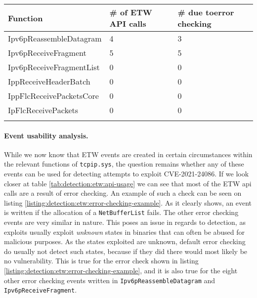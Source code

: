 \documentclass{report}
\begin{document}
{
\begin{tabularx}{\textwidth}{llX}
\textbf{Function}        & \textbf{\# of \gls{ETW} API calls} & \textbf{\# due to\newline error checking} \\ \hline
Ipv6pReassembleDatagram  & 4                            & 3                                 \\
Ipv6pReceiveFragment     & 5                            & 5                                 \\
Ipv6pReceiveFragmentList & 0                            & 0                                 \\
IppReceiveHeaderBatch    & 0                            & 0                                 \\
IppFlcReceivePacketsCore & 0                            & 0                                 \\
IpFlcReceivePackets      & 0                            & 0                                 \\
\caption{\gls{ETW} API calls for functions related to CVE-2021-24086}
\label{tab:detection:etw:api-usage}
\end{tabularx}
}


\paragraph{Event usability analysis.}
While we now know that \gls{ETW} events are created in certain circumstances within the relevant functions of \texttt{tcpip.sys}, the question remains whether any of these events can be used for detecting attempts to exploit CVE-2021-24086. If we look closer at table \ref{tab:detection:etw:api-usage} we can see that most of the \gls{ETW} api calls are a result of error checking. An example of such a check can be seen on listing \ref{listing:detection:etw:error-checking-example}. As it clearly shows, an event is written if the allocation of a \texttt{NetBufferList} fails. The other error checking events are very similar in nature. This poses an issue in regards to detection, as exploits usually exploit \emph{unknown} states in binaries that can often be abused for malicious purposes. As the states exploited are unknown, default error checking do usually not detect such states, because if they did there would most likely be no vulnerability. This is true for the error check shown in listing \ref{listing:detection:etw:error-checking-example}, and it is also true for the eight other error checking events written in \texttt{Ipv6pReassembleDatagram} and \texttt{Ipv6pReceiveFragment}.
\end{document}
